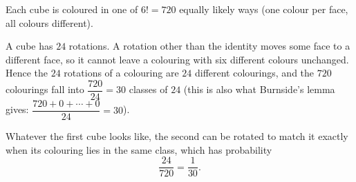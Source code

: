 Each cube is coloured in one of $6!=720$ equally likely ways (one colour per face, all colours different).

A cube has $24$ rotations. A rotation other than the identity moves some face to a different face, so it cannot leave a colouring with six different colours unchanged. Hence the $24$ rotations of a colouring are $24$ different colourings, and the $720$ colourings fall into $\dfrac{720}{24}=30$ classes of $24$ (this is also what Burnside's lemma gives: $\dfrac{720+0+\cdots+0}{24}=30$).

Whatever the first cube looks like, the second can be rotated to match it exactly when its colouring lies in the same class, which has probability
\[\dfrac{24}{720}=\boxed{\dfrac1{30}}.\]
